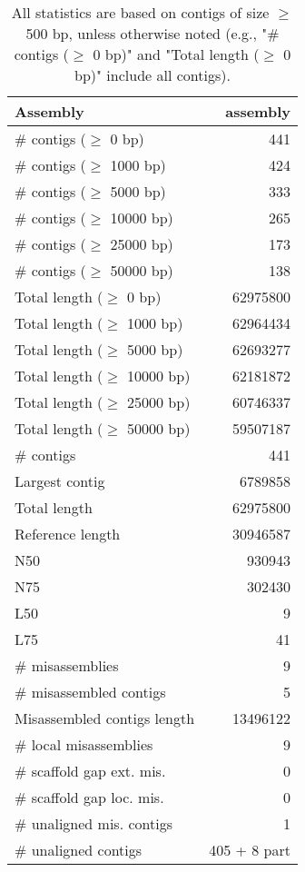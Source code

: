\documentclass[12pt,a4paper]{article}
\begin{document}
\begin{table}[ht]
\begin{center}
\caption{All statistics are based on contigs of size $\geq$ 500 bp, unless otherwise noted (e.g., "\# contigs ($\geq$ 0 bp)" and "Total length ($\geq$ 0 bp)" include all contigs).}
\begin{tabular}{|l*{1}{|r}|}
\hline
Assembly & assembly \\ \hline
\# contigs ($\geq$ 0 bp) & 441 \\ \hline
\# contigs ($\geq$ 1000 bp) & 424 \\ \hline
\# contigs ($\geq$ 5000 bp) & 333 \\ \hline
\# contigs ($\geq$ 10000 bp) & 265 \\ \hline
\# contigs ($\geq$ 25000 bp) & 173 \\ \hline
\# contigs ($\geq$ 50000 bp) & 138 \\ \hline
Total length ($\geq$ 0 bp) & 62975800 \\ \hline
Total length ($\geq$ 1000 bp) & 62964434 \\ \hline
Total length ($\geq$ 5000 bp) & 62693277 \\ \hline
Total length ($\geq$ 10000 bp) & 62181872 \\ \hline
Total length ($\geq$ 25000 bp) & 60746337 \\ \hline
Total length ($\geq$ 50000 bp) & 59507187 \\ \hline
\# contigs & 441 \\ \hline
Largest contig & 6789858 \\ \hline
Total length & 62975800 \\ \hline
Reference length & 30946587 \\ \hline
N50 & 930943 \\ \hline
N75 & 302430 \\ \hline
L50 & 9 \\ \hline
L75 & 41 \\ \hline
\# misassemblies & 9 \\ \hline
\# misassembled contigs & 5 \\ \hline
Misassembled contigs length & 13496122 \\ \hline
\# local misassemblies & 9 \\ \hline
\# scaffold gap ext. mis. & 0 \\ \hline
\# scaffold gap loc. mis. & 0 \\ \hline
\# unaligned mis. contigs & 1 \\ \hline
\# unaligned contigs & 405 + 8 part \\ \hline

\end{tabular}
\end{center}
\end{table}
\end{document}
